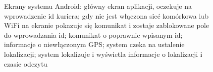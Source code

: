 \documentclass[eng,printmode,oneside]{mgr}
\begin{document}
\begin{figure}
\caption{Ekrany systemu Android:  główny ekran
aplikacji, oczekuje na wprowadzenie id
kuriera;  gdy nie jest włączona sieć komórkowa lub WiFi na
ekranie pokazuje się komunikat i zostaje zablokowane pole do wprowadzania
id;  komunikat o poprawnie wpisanym id;  informacje
o niewłączonym GPS;  system czeka na ustalenie lokalizacji;
 system lokalizuje i wyświetla informacje o lokalizacji i czasie
odczytu}
\label{fig:androidViewOK}
\end{figure}
\end{document}
